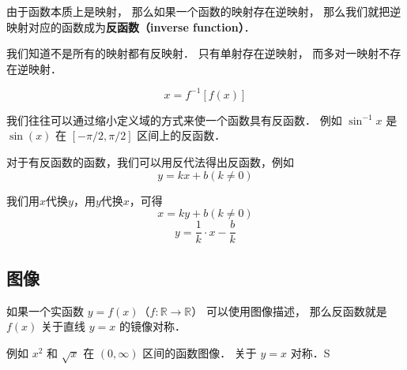 
\begin{issues}
\issueDraft
\end{issues}

由于函数本质上是映射， 那么如果一个函数的映射存在逆映射， 那么我们就把逆映射对应的函数成为\textbf{反函数（inverse function）}．

我们知道不是所有的映射都有反映射． 只有单射存在逆映射， 而多对一映射不存在逆映射．

\begin{equation}
x = f^{-1}[f(x)]
\end{equation}

我们往往可以通过缩小定义域的方式来使一个函数具有反函数． 例如 $\sin^{-1} x$ 是 $\sin(x)$ 在 $[-\pi/2, \pi/2]$ 区间上的反函数．

对于有反函数的函数，我们可以用反代法得出反函数，例如
\begin{equation}
y = kx + b (k \ne 0)
\end{equation}

我们用$x$代换$y$，用$y$代换$x$，可得
\begin{equation}
x = ky + b (k \ne 0)
\end{equation}
\begin{equation}
y = \frac{1}{k} \cdot x - \frac{b}{k}
\end{equation}

\subsection{图像}
如果一个实函数 $y = f(x)$（$f: \mathbb R \to \mathbb R$） 可以使用图像描述， 那么反函数就是 $f(x)$ 关于直线 $y = x$ 的镜像对称．

例如 $x^2$ 和 $\sqrt{x}$ 在 $(0, \infty)$ 区间的函数图像． 关于 $y = x$ 对称．S